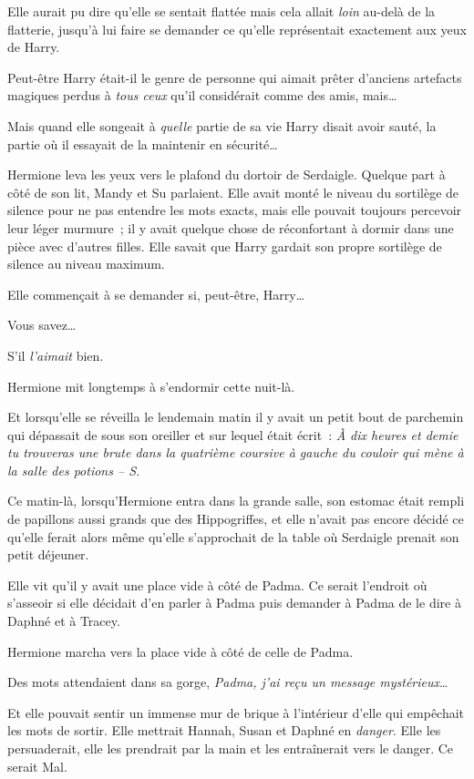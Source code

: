 Elle aurait pu dire qu'elle se sentait flattée mais cela allait \emph{loin} au-delà de la flatterie, jusqu'à lui faire se demander ce qu'elle représentait exactement aux yeux de Harry.

Peut-être Harry était-il le genre de personne qui aimait prêter d'anciens artefacts magiques perdus à \emph{tous ceux} qu'il considérait comme des amis, mais…

Mais quand elle songeait à \emph{quelle} partie de sa vie Harry disait avoir sauté, la partie où il essayait de la maintenir en sécurité…

Hermione leva les yeux vers le plafond du dortoir de Serdaigle. Quelque part à côté de son lit, Mandy et Su parlaient. Elle avait monté le niveau du sortilège de silence pour ne pas entendre les mots exacts, mais elle pouvait toujours percevoir leur léger murmure~; il y avait quelque chose de réconfortant à dormir dans une pièce avec d'autres filles. Elle savait que Harry gardait son propre sortilège de silence au niveau maximum.

Elle commençait à se demander si, peut-être, Harry…

Vous savez…

S'il \emph{l'aimait} bien.

Hermione mit longtemps à s'endormir cette nuit-là.

Et lorsqu'elle se réveilla le lendemain matin il y avait un petit bout de parchemin qui dépassait de sous son oreiller et sur lequel était écrit~: \emph{À dix heures et demie tu trouveras une brute dans la quatrième coursive à gauche du couloir qui mène à la salle des potions -- S.}

\later

Ce matin-là, lorsqu'Hermione entra dans la grande salle, son estomac était rempli de papillons aussi grands que des Hippogriffes, et elle n'avait pas encore décidé ce qu'elle ferait alors même qu'elle s'approchait de la table où Serdaigle prenait son petit déjeuner.

Elle vit qu'il y avait une place vide à côté de Padma. Ce serait l'endroit où s'asseoir si elle décidait d'en parler à Padma puis demander à Padma de le dire à Daphné et à Tracey.

Hermione marcha vers la place vide à côté de celle de Padma.

Des mots attendaient dans sa gorge, \emph{Padma, j'ai reçu un message mystérieux}…

Et elle pouvait sentir un immense mur de brique à l'intérieur d'elle qui empêchait les mots de sortir. Elle mettrait Hannah, Susan et Daphné en \emph{danger}. Elle les persuaderait, elle les prendrait par la main et les entraînerait vers le danger. Ce serait Mal.

